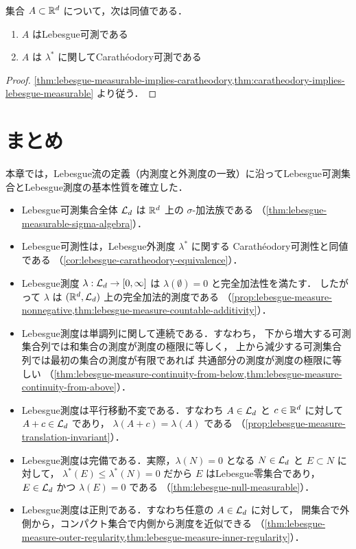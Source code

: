 \begin{corollary}[Lebesgue可測性とCarathéodory可測性の一致]\label{cor:lebesgue-caratheodory-equivalence}
集合 $A\subset\mathbb R^d$ について，次は同値である．
\begin{enumerate}
    \item $A$ はLebesgue可測である
    \item $A$ は $\lambda^*$ に関してCarathéodory可測である
\end{enumerate}
\end{corollary}
\begin{proof}
\cref{thm:lebesgue-measurable-implies-caratheodory,thm:caratheodory-implies-lebesgue-measurable}
より従う．
\end{proof}

\section{まとめ}

本章では，Lebesgue流の定義（内測度と外測度の一致）に沿ってLebesgue可測集合とLebesgue測度の基本性質を確立した．
\begin{itemize}
    \item Lebesgue可測集合全体 $\mathcal L_d$ は $\mathbb R^d$ 上の $\sigma$-加法族である
    （\cref{thm:lebesgue-measurable-sigma-algebra}）．
    \item Lebesgue可測性は，Lebesgue外測度 $\lambda^*$ に関する
    Carathéodory可測性と同値である
    （\cref{cor:lebesgue-caratheodory-equivalence}）．
    \item Lebesgue測度 $\lambda:\mathcal L_d\to[0,\infty]$ は
    $\lambda(\emptyset)=0$ と完全加法性を満たす．
    したがって $\lambda$ は $(\mathbb R^d,\mathcal L_d)$ 上の完全加法的測度である
    （\cref{prop:lebesgue-measure-nonnegative,thm:lebesgue-measure-countable-additivity}）．
    \item Lebesgue測度は単調列に関して連続である．すなわち，
    下から増大する可測集合列では和集合の測度が測度の極限に等しく，
    上から減少する可測集合列では最初の集合の測度が有限であれば
    共通部分の測度が測度の極限に等しい
    （\cref{thm:lebesgue-measure-continuity-from-below,thm:lebesgue-measure-continuity-from-above}）．
    \item Lebesgue測度は平行移動不変である．すなわち
    $A\in\mathcal L_d$ と $c\in\mathbb R^d$ に対して $A+c\in\mathcal L_d$ であり，
    $\lambda(A+c)=\lambda(A)$ である
    （\cref{prop:lebesgue-measure-translation-invariant}）．
    \item Lebesgue測度は完備である．実際，$\lambda(N)=0$ となる
    $N\in\mathcal L_d$ と $E\subset N$ に対して，
    $\lambda^*(E)\le\lambda^*(N)=0$ だから $E$ はLebesgue零集合であり，
    $E\in\mathcal L_d$ かつ $\lambda(E)=0$ である
    （\cref{thm:lebesgue-null-measurable}）．
    \item Lebesgue測度は正則である．すなわち任意の $A\in\mathcal L_d$ に対して，
    開集合で外側から，コンパクト集合で内側から測度を近似できる
    （\cref{thm:lebesgue-measure-outer-regularity,thm:lebesgue-measure-inner-regularity}）．
\end{itemize}
